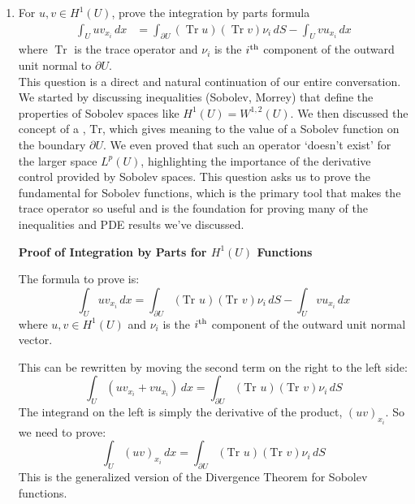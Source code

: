 \documentclass[12pt,a4paper]{report}
\newcommand{\TRR}{\operatorname{Tr}}
\begin{document}
\begin{enumerate}
\begin{enumerate}
    This distance does not go to zero as $k, m \to \infty$. Therefore, the sequence is not a Cauchy sequence in $L^p(\mathbb{R}^n)$. Since every convergent sequence must be Cauchy, our sequence (and any of its subsequences) cannot converge in $L^p(\mathbb{R}^n)$.
\end{enumerate}

This example perfectly illustrates the `loss of compactness' due to the unboundedness of the domain $\mathbb{R}^n$.
	
	\newpage
	\item For $u,v \in H^1(U)$, prove the integration by parts formula
	\begin{align*}
		\int_U uv_{x_i}\,dx &= \int_{\partial U} (\TRR u)(\TRR v) \nu_i\, dS- \int_U vu_{x_i}\, dx
	\end{align*}where $\TRR$ is the trace operator and $\nu_i$ is the $i\textsuperscript{th}$ component of the outward unit normal to $\partial U$. \\
	
	This question is a direct and natural continuation of our entire conversation. We started by discussing inequalities (Sobolev, Morrey) that define the properties of Sobolev spaces like $H^1(U) = W^{1,2}(U)$. We then discussed the concept of a , $\text{Tr}$, which gives meaning to the value of a Sobolev function on the boundary $\partial U$. We even proved that such an operator `doesn't exist' for the larger space $L^p(U)$, highlighting the importance of the derivative control provided by Sobolev spaces. This question asks us to prove the fundamental  for Sobolev functions, which is the primary tool that makes the trace operator so useful and is the foundation for proving many of the inequalities and PDE results we've discussed.

\textbf{Proof of Integration by Parts for $H^1(U)$ Functions}

The formula to prove is:
\[
\int_U u v_{x_i}\,dx = \int_{\partial U} (\text{Tr } u)(\text{Tr } v) \nu_i\, dS - \int_U v u_{x_i}\, dx
\]
where $u, v \in H^1(U)$ and $\nu_i$ is the $i\textsuperscript{th}$ component of the outward unit normal vector.

This can be rewritten by moving the second term on the right to the left side:
\[
\int_U (u v_{x_i} + v u_{x_i})\,dx = \int_{\partial U} (\text{Tr } u)(\text{Tr } v) \nu_i\, dS
\]
The integrand on the left is simply the derivative of the product, $(uv)_{x_i}$. So we need to prove:
\[
\int_U (uv)_{x_i}\,dx = \int_{\partial U} (\text{Tr } u)(\text{Tr } v) \nu_i\, dS
\]
This is the generalized version of the Divergence Theorem for Sobolev functions.


\end{enumerate}
\end{document}
